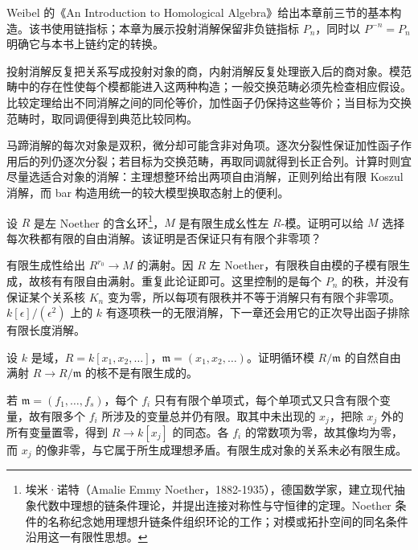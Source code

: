 \ProseParagraphBreak
Weibel 的《An Introduction to Homological Algebra》\cite[Sections 2.2--2.3, Comparison Theorem 2.2.6, Horseshoe Lemma 2.2.8, Comparison Theorem 2.3.7]{Weibel1994HomologicalAlgebra}给出本章前三节的基本构造。该书使用链指标；本章为展示投射消解保留非负链指标 \(P_n\)，同时以 \(P^{-n}=P_n\) 明确它与本书上链约定的转换。






\begin{chaptersummary}
	投射消解反复把关系写成投射对象的商，内射消解反复处理嵌入后的商对象。模范畴中的存在性使每个模都能进入这两种构造；一般交换范畴必须先检查相应假设。比较定理给出不同消解之间的同伦等价，加性函子仍保持这些等价；当目标为交换范畴时，取同调便得到典范比较同构。

	\ProseParagraphBreak
	马蹄消解的每次对象是双积，微分却可能含非对角项。逐次分裂性保证加性函子作用后的列仍逐次分裂；若目标为交换范畴，再取同调就得到长正合列。计算时则宜尽量选适合对象的消解：主理想整环给出两项自由消解，正则列给出有限 Koszul 消解，而 bar 构造用统一的较大模型换取态射上的便利。
\end{chaptersummary}

\BookExercises

\begin{exercise}\label{b4:ex:07-noetherian-finite-resolution}
	设 \(R\) 是左 Noether 的含幺环\footnote{埃米·诺特（Amalie Emmy Noether，1882-1935），德国数学家，建立现代抽象代数中理想的链条件理论，并提出连接对称性与守恒律的定理。Noether 条件的名称纪念她用理想升链条件组织环论的工作；对模或拓扑空间的同名条件沿用这一有限性思想。}，\(M\) 是有限生成幺性左 \(R\)-模。证明可以给 \(M\) 选择每次秩都有限的自由消解。该证明是否保证只有有限个非零项？
\end{exercise}
\begin{solution}
	有限生成性给出 \(R^{r_0}\to M\) 的满射。因 \(R\) 左 Noether，有限秩自由模的子模有限生成，故核有有限自由满射。重复此论证即可。这里控制的是每个 \(P_n\) 的秩，并没有保证某个关系核 \(K_n\) 变为零，所以每项有限秩并不等于消解只有有限个非零项。\(k[\epsilon]/(\epsilon^2)\) 上的 \(k\) 有逐项秩一的无限消解，下一章还会用它的正次导出函子排除有限长度消解。
\end{solution}

\begin{exercise}\label{b4:ex:07-nonnoetherian-relations}
	设 \(k\) 是域，\(R=k[x_1,x_2,\ldots]\)，\(\mathfrak m=(x_1,x_2,\ldots)\)。证明循环模 \(R/\mathfrak m\) 的自然自由满射 \(R\to R/\mathfrak m\) 的核不是有限生成的。
\end{exercise}
\begin{solution}
	若 \(\mathfrak m=(f_1,\ldots,f_s)\)，每个 \(f_i\) 只有有限个单项式，每个单项式又只含有限个变量，故有限多个 \(f_i\) 所涉及的变量总并仍有限。取其中未出现的 \(x_j\)，把除 \(x_j\) 外的所有变量置零，得到 \(R\to k[x_j]\) 的同态。各 \(f_i\) 的常数项为零，故其像均为零，而 \(x_j\) 的像非零，与它属于所生成理想矛盾。有限生成对象的关系未必有限生成。
\end{solution}

